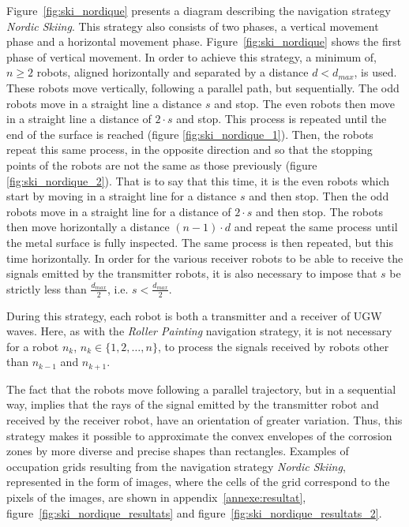 Figure~\ref{fig:ski_nordique} presents a diagram describing the navigation strategy \textit{Nordic Skiing}.
This strategy also consists of two phases, a vertical movement phase and a horizontal movement phase.
Figure~\ref{fig:ski_nordique} shows the first phase of vertical movement.
In order to achieve this strategy, a minimum of, $n \ge 2$ robots, aligned horizontally and separated by a distance $d < d_{max}$, is used.
These robots move vertically, following a parallel path, but sequentially.
The odd robots move in a straight line a distance $s$ and stop.
The even robots then move in a straight line a distance of $2 \cdot s$ and stop.
This process is repeated until the end of the surface is reached (figure \ref{fig:ski_nordique_1}).
Then, the robots repeat this same process, in the opposite direction and so that the stopping points of the robots are not the same as those previously (figure \ref{fig:ski_nordique_2}).
That is to say that this time, it is the even robots which start by moving in a straight line for a distance $s$ and then stop.
Then the odd robots move in a straight line for a distance of $2 \cdot s$ and then stop.
The robots then move horizontally a distance $(n - 1) \cdot d$ and repeat the same process until the metal surface is fully inspected.
The same process is then repeated, but this time horizontally.
In order for the various receiver robots to be able to receive the signals emitted by the transmitter robots, it is also necessary to impose that $s$ be strictly less than $\frac{d_{max}}{2}$, i.e. $s < \frac{d_ {max}}{2}$.

During this strategy, each robot is both a transmitter and a receiver of UGW waves.
Here, as with the \textit{Roller Painting} navigation strategy, it is not necessary for a robot $n_k$, $n_k \in \{1, 2, \dots, n\}$, to process the signals received by robots other than $n_{k-1}$ and $n_{k+1}$.

The fact that the robots move following a parallel trajectory, but in a sequential way, implies that the rays of the signal emitted by the transmitter robot and received by the receiver robot, have an orientation of greater variation.
Thus, this strategy makes it possible to approximate the convex envelopes of the corrosion zones by more diverse and precise shapes than rectangles.
Examples of occupation grids resulting from the navigation strategy \textit{Nordic Skiing}, represented in the form of images, where the cells of the grid correspond to the pixels of the images, are shown in appendix~\ref{annexe:resultat}, figure~\ref{fig:ski_nordique_resultats} and figure~\ref{fig:ski_nordique_resultats_2}.

